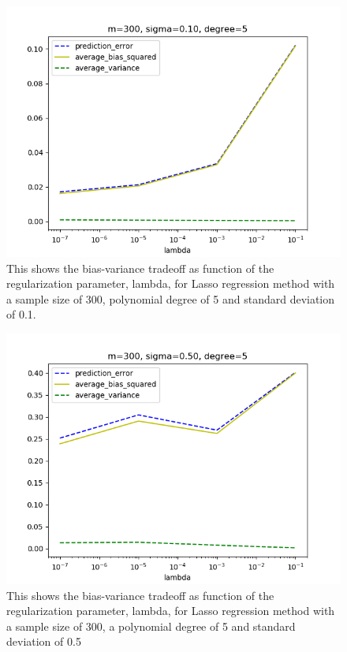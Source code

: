 \medskip

\FloatBarrier
\begin{figure}[!ht]
	\centering
	\FloatBarrier
	\includegraphics[width=1\textwidth]{plot_lasso_without_r2/lassoprediction_error_m300_d5_s10.png}
	
	\caption{This shows the bias-variance tradeoff as function of the regularization parameter, lambda, for Lasso regression method with a sample size of 300, polynomial degree of 5 and standard deviation of 0.1.}
	\label{fig:3}
\end{figure}
\FloatBarrier

\medskip

\FloatBarrier
\begin{figure}[!ht]
	\centering
	\FloatBarrier
	\includegraphics[width=1\textwidth]{plot_lasso_without_r2/lassoprediction_error_m300_d5_s50.png}
	
	\caption{This shows the bias-variance tradeoff as function of the regularization parameter, lambda, for Lasso regression method with a sample size of 300, a polynomial degree of 5 and standard deviation of 0.5}
	\label{fig:3}
\end{figure}
\FloatBarrier

